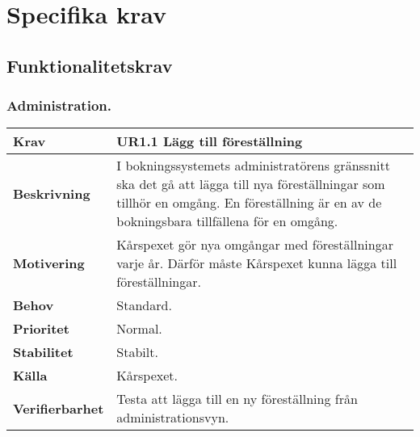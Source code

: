 \documentclass[a4paper, twoside, 11pt, titlepage]{article}
\begin{document}
\clearpage
\section{Specifika krav}



	\subsection{Funktionalitetskrav}



		\subsubsection{Administration.}


		\begin {table} [ht] \begin{tabular} { p{2.6cm} p{12.5cm} }
			\hline
			{\sffamily\textbf{Krav}} & {\sffamily\textbf{UR1.1 Lägg till föreställning }} \\
			\hline
			{\sffamily\textbf{Beskrivning}} & {I bokningssystemets administratörens gränssnitt ska det gå att lägga till nya föreställningar som tillhör en omgång. En föreställning är en av de bokningsbara tillfällena för en omgång.} \\
			\hline
			{\sffamily\textbf{Motivering}} & {Kårspexet gör nya omgångar med föreställningar varje år. Därför måste Kårspexet kunna lägga till föreställningar.} \\
			\hline
			{\sffamily\textbf{Behov}} & {Standard.} \\
			\hline
			{\sffamily\textbf{Prioritet}} & {Normal.} \\
			\hline
			{\sffamily\textbf{Stabilitet}} & {Stabilt.} \\
			\hline
			{\sffamily\textbf{Källa}} & {Kårspexet.} \\
			\hline
			{\sffamily\textbf{Verifierbarhet}} & {Testa att lägga till en ny föreställning från administrationsvyn.} \\
			\hline
		\end{tabular} \end{table} \FloatBarrier
		\vspace{6mm}
\end{document}
